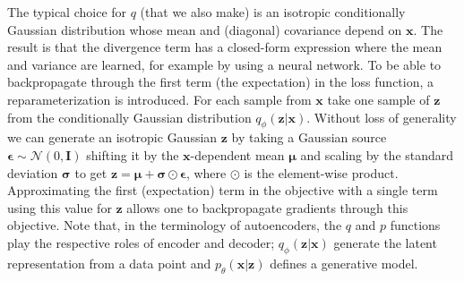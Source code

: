 The typical choice for $q$ (that we also make) is an isotropic conditionally Gaussian distribution whose mean and (diagonal) covariance depend on $\mathbf{x}$.  The result is that the divergence term has a closed-form expression where the mean and variance are learned, for example by using a neural network.  To be able to backpropagate through the first term (the expectation) in the loss function, a reparameterization  is introduced.  For each sample from $\mathbf{x}$ take one sample of $\mathbf{z}$ from the conditionally Gaussian distribution $q_\phi(\mathbf{z}|\mathbf{x})$.  Without loss of generality we can generate an isotropic Gaussian $\mathbf{z}$ by taking a Gaussian source $\boldsymbol{\epsilon} \sim \mathcal{N}(0, \mathrm{\mathbf{I}})$ shifting it by the $\mathbf{x}$-dependent mean $\mathbf{\mu}$ and scaling by the standard deviation $\boldsymbol{\sigma}$ to get $\mathbf{z} = \boldsymbol{\mu}+\boldsymbol{\sigma}\odot \boldsymbol{\epsilon}$, where $\odot$ is the element-wise product.  Approximating the first (expectation) term in the objective with a single term using this value for $\mathbf{z}$ allows one to backpropagate gradients through this objective.  Note that, in the terminology of autoencoders, the $q$ and $p$ functions play the respective roles of encoder and decoder; $q_{\phi}(\mathbf{z} | \mathbf{x})$ generate the latent representation from a data point and  $p_{\theta}(\mathbf{x} | \mathbf{z})$ defines a generative model.




